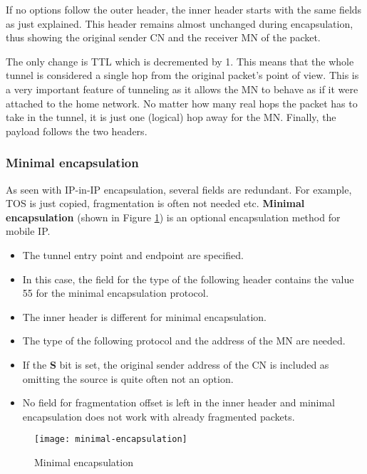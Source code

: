 	
If no options follow the outer header, the inner header starts with the same fields as just explained. This header remains almost unchanged during encapsulation, thus showing the original sender CN and the receiver MN of the packet.

The only change is TTL which is decremented by 1. This means that the whole tunnel is considered a single hop from the original packet’s point of view. This is a very important feature of tunneling as it allows the MN to behave as if it were attached to the home network. No matter how many real hops the packet has to take in the tunnel, it is just one (logical) hop away for the MN. Finally, the payload follows the two headers.



\subsubsection{Minimal encapsulation}


As seen with IP-in-IP encapsulation, several fields are redundant. For example, TOS is just copied, fragmentation is often not needed etc.  \textbf{Minimal encapsulation} (shown in Figure \ref{fig:minimal-encapsulation}) is an optional encapsulation method for mobile IP. 
\begin{multicols}{2}
	\begin{itemize}
		\item The tunnel entry point and endpoint are specified. 
		\item In this case, the field for the type of the following header contains the value 55 for the minimal encapsulation protocol. 
		\item The inner header is different	for minimal encapsulation. 
		\item The type of the following protocol and the address of the MN are needed. 
		\item If the \textbf{S} bit is set, the original sender address of the CN is included as omitting the source is quite often not an option. 
		\item No field for fragmentation offset is left in the inner header and minimal encapsulation does not work with already fragmented packets.
	\end{itemize}
\end{multicols}


\begin{figure}[ht!]
	\centering
	\texttt{[image: minimal-encapsulation]} 
	\caption{Minimal encapsulation}
	\label{fig:minimal-encapsulation}
\end{figure}

